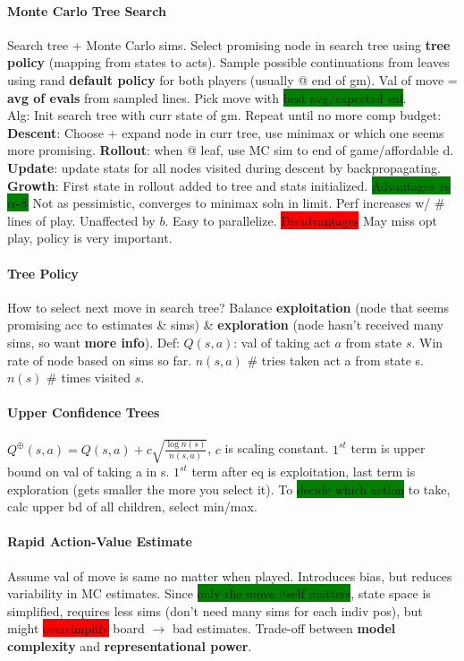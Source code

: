 \paragraph{Monte Carlo Tree Search} Search tree + Monte Carlo
sims. Select promising node in search tree using \textbf{tree policy}
(mapping from states to acts). Sample possible continuations from
leaves using rand \textbf{default policy} for both players (usually @
end of gm). Val of move = \textbf{avg of evals} from sampled
lines. Pick move with \colorbox{green}{best avg/expected val}.
\\ Alg: Init search tree with curr state of gm. Repeat until no more
comp budget: \textbf{Descent}: Choose + expand node in curr tree, use minimax
or which one seems more promising. \textbf{Rollout}: when @ leaf, use
MC sim to end of game/affordable d. \textbf{Update}: update stats for
all nodes visited during descent by backpropagating. \textbf{Growth}:
First state in rollout added to tree and stats initialized.
\colorbox{green}{Advantages vs $\alpha\hbox{-}\beta$} Not as
pessimistic, converges to minimax soln in limit. Perf increases w/ \#
lines of play. Unaffected by $b$. Easy to
parallelize. \colorbox{red}{Disadvantages} May miss opt play, policy
is very important.
\paragraph{Tree Policy} How to select next move in search tree?
Balance \textbf{exploitation} (node that seems promising acc to
estimates \& sims) \& \textbf{exploration} (node hasn't received many
sims, so want \textbf{more info}). Def: $Q(s,a)$: val of taking act
$a$ from state $s$. Win rate of node based on sims so far. $n(s,a)$
\# tries taken act a from state s. $n(s)$ \# times visited $s$.
\paragraph{Upper Confidence Trees}
$Q^{\oplus}(s,a)=Q(s,a)+c\sqrt{\frac{\log n(s)}{n(s,a)}}$, $c$ is
scaling constant. $1^{st}$ term is upper bound on val of taking a in
s.  $1^{st}$ term after eq is exploitation, last term is exploration
(gets smaller the more you select it). To \colorbox{green}{decide
  which action} to take, calc upper bd of all children, select
min/max.
\paragraph{Rapid Action-Value Estimate} Assume val of move is same no
matter when played. Introduces bias, but reduces variability in MC
estimates. Since \colorbox{green}{only the move itself matters}, state
space is simplified, requires less sims (don't need many sims for each
indiv pos), but might \colorbox{red}{oversimplify} board $\to$ bad
estimates. Trade-off between \textbf{model complexity} and
\textbf{representational power}.
\color[HTML]{666666}
